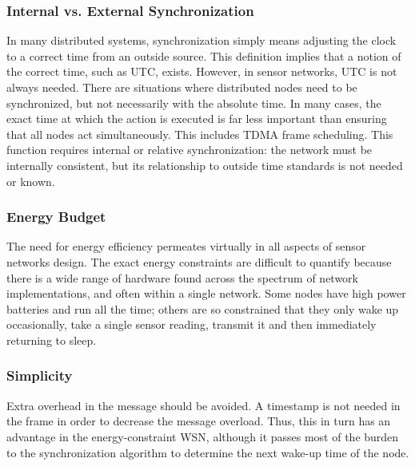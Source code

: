 \documentclass[a4paper,10pt]{report}
\begin{document}
\subsubsection{\textbf{Internal vs. External Synchronization}}
In many distributed systems, synchronization simply means adjusting the clock to a correct time from an outside source. This
definition implies that a notion of the correct time, such as UTC, exists. However, in sensor networks, UTC is not always needed. There
are situations where distributed nodes need to be synchronized, but not necessarily with the absolute time.
In many cases, the exact time at which the action is executed is far less important than ensuring that all nodes act simultaneously. This
includes TDMA frame scheduling. This function requires internal or relative synchronization: the network must be internally consistent,
but its relationship to outside time standards is not needed or known.
\subsubsection{\textbf{Energy Budget}} The need for energy efficiency permeates virtually in all aspects of sensor networks design. The
exact energy constraints are difficult to quantify because there is a wide range of hardware found across the spectrum of network
implementations, and often within a single network. Some nodes have high power batteries and run all the time; others are so constrained that
they only wake up occasionally, take a single sensor reading, transmit it and then immediately returning to sleep.
\subsubsection{\textbf{Simplicity}} Extra overhead in the message should be avoided. A timestamp is not needed in the frame in order to decrease the message overload. Thus, this in turn has an advantage in the energy-constraint WSN, although it passes most of the burden to the synchronization algorithm to determine the next wake-up time of the node.
\end{document}

